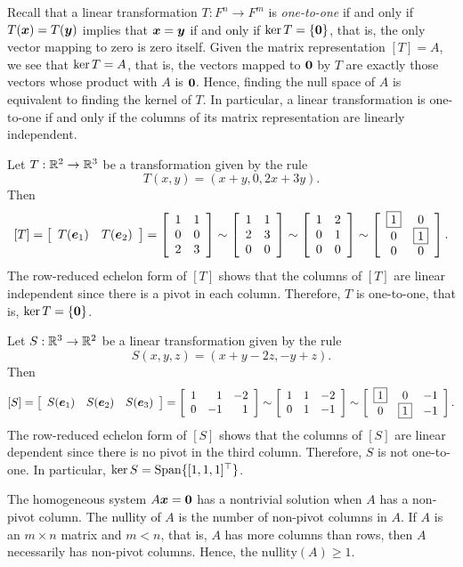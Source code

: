 Recall that a linear transformation $T : F^n\to F^m$ is \emph{one-to-one} if and only if $T(\bb x) = T(\bb y)$ implies that $\bb x=\bb y$ if and only if $\ker T = \{\bb 0\}$, that is, the only vector mapping to zero is zero itself. Given the matrix representation $[T] = A$, we see that $\ker T = \null A$, that is, the vectors mapped to $\bb 0$ by $T$ are exactly those vectors whose product with $A$ is $\bb 0$. Hence, finding the null space of $A$ is equivalent to finding the kernel of $T$. In particular, a linear transformation is one-to-one if and only if the columns of its matrix representation are linearly independent.\\

\begin{Exam}\label{exam:transT} Let $T : \R^2 \to \R^3$ be a transformation given by the rule
\[T(x,y) = (x+y, 0, 2x+3y).\] Then 
\[[T] = \mtx{cc}{T(\bb e_1) & T(\bb e_2)} = \mtx{rr}{1&1\\0&0\\2&3} \sim \mtx{rr}{1&1\\2&3\\0&0} \sim \mtx{rr}{1&2\\0&1\\0&0} \sim \mtx{cc}{\fbox{$1$}&0\\0&\fbox{$1$}\\0&0}.\] The row-reduced echelon form of $[T]$ shows that the columns of $[T]$ are linear independent since there is  a pivot in each column. Therefore, $T$ is one-to-one, that is, $\ker T=\{\bb 0\}$.
\end{Exam}\vs

\begin{Exam}\label{exam:transS} Let $S : \R^3 \to \R^2$ be a linear transformation given by the rule 
\[S(x, y, z) = (x+y-2z, -y+z).\] Then 
\[[S] = \mtx{ccc}{S(\bb e_1) & S(\bb e_2) & S(\bb e_3)} = \mtx{rrr}{1&1&-2\\0&-1&1} \sim \mtx{rrr}{1&1&-2\\0&1&-1} \sim \mtx{ccr}{\fbox{$1$}&0&-1\\0&\fbox{$1$}&-1}.\] The row-reduced echelon form of $[S]$ shows that the columns of $[S]$ are linear dependent since there is no pivot in the third column. Therefore, $S$ is not one-to-one. In particular, $\ker S= \Span\{[1, 1, 1]^\top \}$.
\end{Exam}\vs

The homogeneous system $A\bb x = \bb 0$ has a nontrivial solution when $A$ has a non-pivot column. The nullity of $A$ is the number of non-pivot columns in $A$. If $A$ is an $m\times n$ matrix and $m<n$, that is, $A$ has more columns than rows, then $A$ necessarily has non-pivot columns. Hence, the $\text{nullity}(A) \ge 1$.\\

